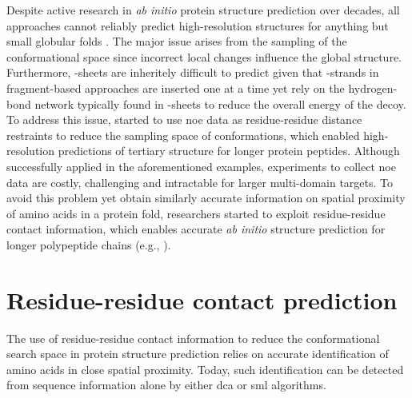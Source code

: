 Despite active research in \textit{ab initio} protein structure prediction over decades, all approaches cannot reliably predict high-resolution structures for anything but small globular folds \cite{Bradley2005-lw,Tai2014-rz,He2013-gm,Kinch2011-py}. The major issue arises from the sampling of the conformational space since incorrect local changes influence the global structure. Furthermore, \textbeta-sheets are inheritely difficult to predict given that \textbeta-strands in fragment-based approaches are inserted one at a time yet rely on the hydrogen-bond network typically found in \textbeta-sheets to reduce the overall energy of the decoy. To address this issue, \textcite{Lange2012-yh,Raman2010-xv,Gobl2014-gc} started to use \gls{noe} data as residue-residue distance restraints to reduce the sampling space of conformations, which enabled high-resolution predictions of tertiary structure for longer protein peptides. Although successfully applied in the aforementioned examples, experiments to collect \gls{noe} data are costly, challenging and intractable for larger multi-domain targets. To avoid this problem yet obtain similarly accurate information on spatial proximity of amino acids in a protein fold, researchers started to exploit residue-residue contact information, which enables accurate \textit{ab initio} structure prediction for longer polypeptide chains (e.g., \cite{Marks2011-os,Michel2014-eg,Kosciolek2014-bt,Ovchinnikov2015-tn,Ovchinnikov2016-jj,Michel2017-xh,De_Oliveira2017-sg,Ovchinnikov2017-nd,Wang2017-rx}).

%
%

\section{Residue-residue contact prediction} \label{sec:introduction_contact_prediction}
The use of residue-residue contact information to reduce the conformational search space in protein structure prediction relies on accurate identification of amino acids in close spatial proximity. Today, such identification can be detected from sequence information alone by either \gls{dca} or \gls{sml} algorithms.

